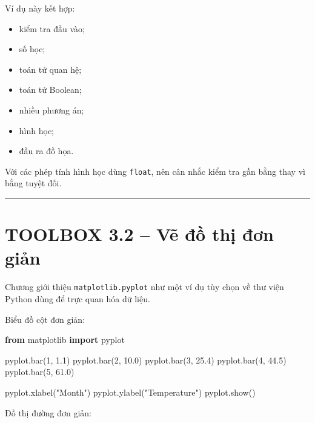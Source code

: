 \documentclass[
  11pt,
  a4paper,
]{article}
\newenvironment{Shaded}{}{}
\newcommand{\DecValTok}[1]{\textcolor[rgb]{0.25,0.63,0.44}{#1}}
\newcommand{\FloatTok}[1]{\textcolor[rgb]{0.25,0.63,0.44}{#1}}
\newcommand{\ImportTok}[1]{\textcolor[rgb]{0.00,0.50,0.00}{\textbf{#1}}}
\newcommand{\NormalTok}[1]{#1}
\newcommand{\StringTok}[1]{\textcolor[rgb]{0.25,0.44,0.63}{#1}}
\providecommand{\tightlist}{%
  \setlength{\itemsep}{0pt}\setlength{\parskip}{0pt}}
\begin{document}
Ví dụ này kết hợp:

\begin{itemize}
\tightlist
\item
  kiểm tra đầu vào;
\item
  số học;
\item
  toán tử quan hệ;
\item
  toán tử Boolean;
\item
  nhiều phương án;
\item
  hình học;
\item
  đầu ra đồ họa.
\end{itemize}

Với các phép tính hình học dùng \texttt{float}, nên cân nhắc kiểm tra
gần bằng thay vì bằng tuyệt đối.

\begin{center}\rule{0.5\linewidth}{0.5pt}\end{center}

\section{TOOLBOX 3.2 -- Vẽ đồ thị đơn
giản}\label{toolbox-3.2-vux1ebd-ux111ux1ed3-thux1ecb-ux111ux1a1n-giux1ea3n}

Chương giới thiệu \texttt{matplotlib.pyplot} như một ví dụ tùy chọn về
thư viện Python dùng để trực quan hóa dữ liệu.

Biểu đồ cột đơn giản:

\begin{Shaded}
\begin{Highlighting}[]
\ImportTok{from}\NormalTok{ matplotlib }\ImportTok{import}\NormalTok{ pyplot}

\NormalTok{pyplot.bar(}\DecValTok{1}\NormalTok{, }\FloatTok{1.1}\NormalTok{)}
\NormalTok{pyplot.bar(}\DecValTok{2}\NormalTok{, }\FloatTok{10.0}\NormalTok{)}
\NormalTok{pyplot.bar(}\DecValTok{3}\NormalTok{, }\FloatTok{25.4}\NormalTok{)}
\NormalTok{pyplot.bar(}\DecValTok{4}\NormalTok{, }\FloatTok{44.5}\NormalTok{)}
\NormalTok{pyplot.bar(}\DecValTok{5}\NormalTok{, }\FloatTok{61.0}\NormalTok{)}

\NormalTok{pyplot.xlabel(}\StringTok{"Month"}\NormalTok{)}
\NormalTok{pyplot.ylabel(}\StringTok{"Temperature"}\NormalTok{)}
\NormalTok{pyplot.show()}
\end{Highlighting}
\end{Shaded}

Đồ thị đường đơn giản:
\end{document}
